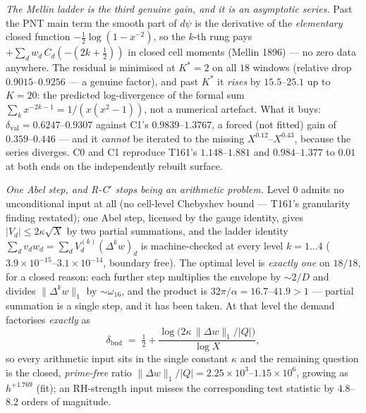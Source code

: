 \documentclass[11pt,a4paper]{article}
\begin{document}
\emph{The Mellin ladder is the third genuine gain, and it is an asymptotic
series.} Past the PNT main term the smooth part of $d\psi$ is the derivative of
the \emph{elementary} closed function $-\tfrac12\log(1-x^{-2})$, so the $k$-th
rung pays $+\sum_dw_d\,C_d(-(2k+\tfrac12))$ in closed cell moments (Mellin
1896) --- no zero data anywhere. The residual is minimised at $K^*=2$ on all
$18$ windows (relative drop $0.9015$--$0.9256$ --- a genuine factor), and past
$K^*$ it \emph{rises} by $15.5$--$25.1$ up to $K=20$: the predicted
log-divergence of the formal sum $\sum_kx^{-2k-1}=1/(x(x^2-1))$, not a
numerical artefact. What it buys: $\delta_{\mathrm{val}}=0.6247$--$0.9307$
against C1's $0.9839$--$1.3767$, a forced (not fitted) gain of
$0.359$--$0.446$ --- and it \emph{cannot} be iterated to the missing
$X^{0.12}$--$X^{0.43}$, because the series diverges. C0 and C1 reproduce
T161's $1.148$--$1.881$ and $0.984$--$1.377$ to $0.01$ at both ends on the
independently rebuilt surface.

\emph{One Abel step, and R-C$'$ stops being an arithmetic problem.} Level $0$
admits no unconditional input at all (no cell-level Chebyshev bound --- T161's
granularity finding restated); one Abel step, licensed by the gauge identity,
gives $|V_d|\le2\kappa\sqrt X$ by two partial summations, and the ladder
identity $\sum_dv_dw_d=\sum_dV^{(k)}_d(\Delta^kw)_d$ is machine-checked at
every level $k=1\ldots4$ ($3.9\times10^{-15}$--$3.1\times10^{-14}$, boundary
free). The optimal level is \emph{exactly one} on $18/18$, for a closed reason:
each further step multiplies the envelope by ${\sim}2/D$ and divides
$\|\Delta^kw\|_1$ by ${\sim}\omega_{16}$, and the product is
$32\pi/\alpha=16.7$--$41.9>1$ --- partial summation is a single step, and it has
been taken. At that level the demand factorises \emph{exactly} as
\[
\delta_{\mathrm{bnd}}\;=\;\tfrac12+\frac{\log\!\bigl(2\kappa\,\|\Delta
w\|_1/|Q|\bigr)}{\log X},
\]
so every arithmetic input sits in the single constant $\kappa$ and the
remaining question is the closed, \emph{prime-free} ratio
$\|\Delta w\|_1/|Q|=2.25\times10^{3}$--$1.15\times10^{6}$, growing as
$h^{+1.769}$ (fit); an RH-strength input misses the corresponding test
statistic by $4.8$--$8.2$ orders of magnitude.
\end{document}
